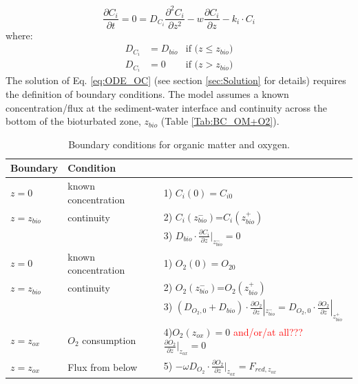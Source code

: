 \documentclass[gmd, manuscript]{copernicus}
\begin{document}
\begin{equation}
 \frac{\partial C_i}{\partial t} = 0= D_{C_i} \frac{\partial^2C_i }{\partial z^2} - w\frac{\partial C_i }{\partial z} - k_i\cdot C_{i} \label{eq:ODE_OC}
\end{equation}
where:
\begin{align}
 D_{C_i}&=D_{bio} 	 &\text{if ($z\leq z_{bio}$)}\\
 D_{C_i}&=0            &\text{if ($z > z_{bio}$)} 
\end{align}
The solution of Eq. \ref{eq:ODE_OC} (see section \ref{sec:Solution} for details) requires the definition of boundary conditions. The model assumes a known concentration/flux at the sediment-water interface and continuity 
across the bottom of the bioturbated zone, $z_{bio}$ (Table \ref{Tab:BC_OM+O2}).
\begin{table}[tbp]
\caption{Boundary conditions for organic matter and oxygen.}
\centering
\begin{tabular}{ |l| l| l|}
\hline
\textbf{Boundary}& \textbf{Condition}&\\
\hline
$z=0$& known concentration& 1) $C_i(0)=C_{i0}$\\
$z=z_{bio}$&continuity& 2) $C_i(z_{bio}^-)$=$C_i(z_{bio}^+)$\\
               &&3) $D_{bio}\cdot \frac{\partial C_i}{\partial z}|_{z_{bio}^-}=0$\\
\hline
$z=0$& known concentration& 1) $O_2(0)=O_{20}$\\
$z=z_{bio}$&continuity& 2) $O_2(z_{bio}^-)$=$O_2(z_{bio}^+)$\\
               &&3) $\left(D_{O_2,0}+D_{bio}\right )\cdot \frac{\partial O_2}{\partial z}|_{z_{bio}^-}=D_{O_2,0} \cdot \frac{\partial O_2}{\partial z}|_{z_{bio}^+}$\\
$z=z_{ox}$& $O_2$ consumption& 4)$ O_2(z_{ox})=0$  \quad \textcolor{red}{and/or/at all???} \quad $\frac{\partial O_2}{\partial z}|_{z_{ox}}=0$\\
$z=z_{ox}$& Flux from below& 5) $-\omega D_{O_2} \cdot \frac{\partial O_2}{\partial z}|_{z_{ox}}=F_{red, z_{ox}}$\\   

\end{tabular}
\end{table}
\end{document}
